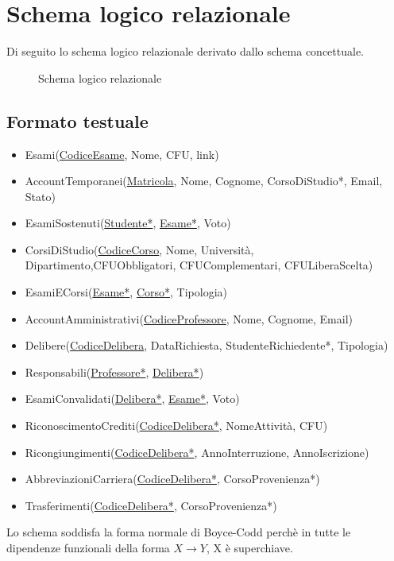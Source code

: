 \section{Schema logico relazionale}
Di seguito lo schema logico relazionale derivato dallo schema 
concettuale.

\begin{figure}[H]
	\centering
	
	\caption{Schema logico relazionale}
\end{figure}

\subsection{Formato testuale}
\begin{itemize}
	\item Esami(\underline{CodiceEsame}, Nome, CFU, link)
	\item AccountTemporanei(\underline{Matricola}, Nome,
	      Cognome, CorsoDiStudio*, Email, Stato)
	\item EsamiSostenuti(\underline{Studente*},
	      \underline{Esame*}, Voto)
	\item CorsiDiStudio(\underline{CodiceCorso}, Nome,
	      Università, Dipartimento,CFUObbligatori,
	      CFUComplementari, CFULiberaScelta)
	\item EsamiECorsi(\underline{Esame*}, \underline{Corso*},
	      Tipologia)
	\item AccountAmministrativi(\underline{CodiceProfessore},
	      Nome, Cognome, Email)
	\item Delibere(\underline{CodiceDelibera}, DataRichiesta,
	      StudenteRichiedente*, Tipologia)
	\item Responsabili(\underline{Professore*},
	      \underline{Delibera*})
	\item EsamiConvalidati(\underline{Delibera*},
	      \underline{Esame*}, Voto)
	\item RiconoscimentoCrediti(\underline{CodiceDelibera*},
	      NomeAttività, CFU)
	\item Ricongiungimenti(\underline{CodiceDelibera*},
	      AnnoInterruzione, AnnoIscrizione)
	\item AbbreviazioniCarriera(\underline{CodiceDelibera*},
	      CorsoProvenienza*)
	\item Trasferimenti(\underline{CodiceDelibera*},
	      CorsoProvenienza*)
\end{itemize}

Lo schema soddisfa la forma normale di Boyce-Codd perchè in
tutte le dipendenze funzionali della forma \(X \rightarrow Y\),
X è superchiave.
